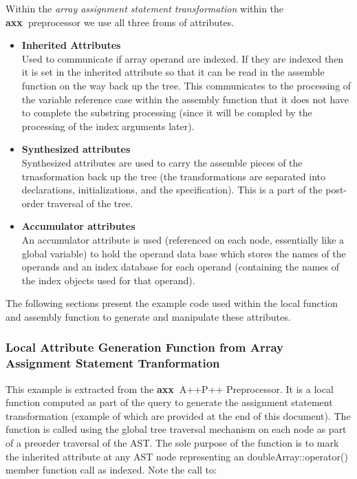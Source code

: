 \documentclass[10pt]{article}
\newcommand{\axx}{{\bf axx\ }}
\begin{document}
   Within the {\it array assignment statement transformation} within the \axx preprocessor we use all three froms of attributes.
\begin{itemize}
     \item {\bf Inherited Attributes} \\ Used to communicate if array operand are indexed.  If they
           are indexed then it is set in the inherited attribute so that it can be read in the
           assemble function on the way back up the tree.  This communicates to the processing of
           the variable reference case within the assembly function that it does not have to
           complete the substring processing (since it will be compled by the processing of the
           index arguments later).

     \item {\bf Synthesized attributes} \\ Synthesized attributes are used to carry the assemble
           pieces of the trnasformation back up the tree (the transformations are separated into
           declarations, initializations, and the specification).  This is a part of the post-order
           traversal of the tree.

     \item {\bf Accumulator attributes} \\ An accumulator attribute is used (referenced on each
           node, essentially like a global variable) to hold the operand data base which stores the
           names of the operands and an index database for each operand (containing the names of the
           index objects used for that operand).
\end{itemize}

The following sections present the example code used within the local function and assembly function
to generate and manipulate these attributes.

\subsubsection{Local Attribute Generation Function from Array Assignment Statement Tranformation}

    This example is extracted from the \axx A++\/P++ Preprocessor.  It is a local function computed
as part of the query to generate the assignment statement transformation (example of which are
provided at the end of this document).  The function is called using the global tree traversal
mechanism on each node as part of a preorder traversal of the AST.  The sole purpose of the function
is to mark the inherited attribute at any AST node representing an doubleArray::operator() member
function call as indexed.  Note the call to:
\end{document}
